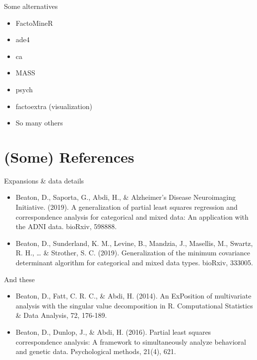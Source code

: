 \documentclass[
  ignorenonframetext,
]{beamer}
\providecommand{\tightlist}{%
  \setlength{\itemsep}{0pt}\setlength{\parskip}{0pt}}
\begin{document}
\begin{frame}{Some alternatives}
\protect\hypertarget{some-alternatives}{}

\begin{itemize}[<+->]
\tightlist
\item
  FactoMineR
\item
  ade4
\item
  ca
\item
  MASS
\item
  psych
\item
  factoextra (visualization)
\item
  So many others
\end{itemize}

\end{frame}

\hypertarget{some-references}{%
\section{(Some) References}\label{some-references}}

\begin{frame}{Expansions \& data details}
\protect\hypertarget{expansions-data-details}{}

\begin{itemize}[<+->]
\item
  Beaton, D., Saporta, G., Abdi, H., \& Alzheimer's Disease Neuroimaging
  Initiative. (2019). A generalization of partial least squares
  regression and correspondence analysis for categorical and mixed data:
  An application with the ADNI data. bioRxiv, 598888.
\item
  Beaton, D., Sunderland, K. M., Levine, B., Mandzia, J., Masellis, M.,
  Swartz, R. H., \ldots{} \& Strother, S. C. (2019). Generalization of
  the minimum covariance determinant algorithm for categorical and mixed
  data types. bioRxiv, 333005.
\end{itemize}

\end{frame}

\begin{frame}{And these}
\protect\hypertarget{and-these}{}

\begin{itemize}[<+->]
\item
  Beaton, D., Fatt, C. R. C., \& Abdi, H. (2014). An ExPosition of
  multivariate analysis with the singular value decomposition in R.
  Computational Statistics \& Data Analysis, 72, 176-189.
\item
  Beaton, D., Dunlop, J., \& Abdi, H. (2016). Partial least squares
  correspondence analysis: A framework to simultaneously analyze
  behavioral and genetic data. Psychological methods, 21(4), 621.
\end{itemize}

\end{frame}
\end{document}
